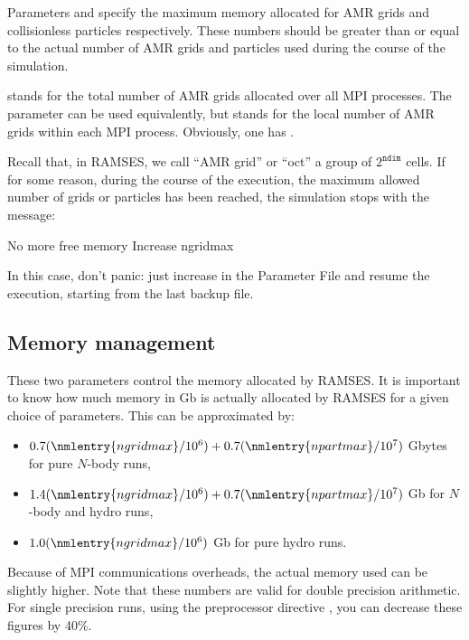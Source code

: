 
Parameters  and  specify the
maximum memory allocated for AMR grids and collisionless particles
respectively. These numbers should be greater than or equal to the
actual number of AMR grids and particles used during the course of the
simulation.

 stands for the total number of AMR grids allocated
over all MPI processes. The  parameter can be used
equivalently, but stands for the local number of AMR grids within each
MPI process. Obviously, one has .

\begin{warning}
Recall that, in RAMSES, we call ``AMR grid'' or ``oct'' a group of
$2^{\mathtt{ndim}}$ cells. If for some reason, during the course of the
execution, the maximum allowed number of grids or particles has been
reached, the simulation stops with the message:
%
\begin{Prompt}
 No more free memory
 Increase ngridmax
\end{Prompt}
%
In this case, don't panic: just increase  in the
Parameter File and resume the execution, starting from the last backup
file.
\end{warning}


\subsection{Memory management}

These two parameters control the memory allocated by RAMSES. It is
important to know how much memory in Gb is actually allocated by RAMSES
for a given choice of parameters. This can be approximated by:

\begin{itemize}
\item $0.7 (\nmlentry{ngridmax}/10^6) + 0.7 (\nmlentry{npartmax}/10^7)$
Gbytes for pure $N$-body runs,
\item $1.4 (\nmlentry{ngridmax}/10^6) + 0.7 (\nmlentry{npartmax}/10^7)$
Gb for $N$-body and hydro runs,
\item $1.0 (\nmlentry{ngridmax}/10^6)$ Gb for pure hydro runs.
\end{itemize}

Because of MPI communications overheads, the actual memory used can be
slightly higher. Note that these numbers are valid for double precision
arithmetic. For single precision runs, using the preprocessor directive
, you can decrease these figures by 40\%.

